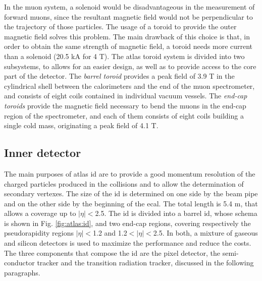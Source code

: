 In the muon system, a solenoid would be disadvantageous in the measurement of forward muons, since the resultant magnetic field would not be perpendicular to the trajectory of those particles. The usage of a toroid to provide the outer magnetic field solves this problem. The main drawback of this choice is that, in order to obtain the same strength of magnetic field, a toroid needs more current than a solenoid (20.5 kA for 4 T).
The \gls{atlas} toroid system is divided into two subsystems, to allows for an easier design, 
as well as to provide access to the core part of the detector.
The \textit{barrel toroid} \cite{ATLAS:1997ac} provides a peak field of 3.9 T in the cylindrical shell between the calorimeters and the end of the muon spectrometer, and consists of eight coils contained in individual vacuum vessels.  
The \textit{end-cap toroids} \cite{ATLAS:1997ab} provide the magnetic field necessary to bend the muons in the end-cap region of the spectrometer, and each of them consists of eight coils building a single cold mass, originating a peak field of 4.1 T. 



\subsection{Inner detector}
\label{sec:atlas:id}

The main purposes of \gls{atlas} \gls{id} \cite{ATLAS:1997ag,ATLAS:1997af} are to provide a good momentum resolution of the charged particles produced in the collisions and to allow the determination of secondary vertexes. The size of the \gls{id} is determined on one side by the beam pipe and on the other side by the beginning of the \gls{ecal}. The total length is 5.4 m, that allows a coverage up to $|\eta|<$2.5.
The \gls{id} is divided into a barrel \gls{id}, whose schema is shown in Fig. \ref{fig:atlas:id}, and two end-cap regions, covering respectively the pseudorapidity regions $|\eta|<$1.2 and 1.2$<|\eta|<$2.5. In both, a mixture of gaseous and silicon detectors is used to maximize the performance and reduce the costs. The three components that compose the \gls{id} are the pixel detector, the semi-conductor tracker and the transition radiation tracker, discussed in the following paragraphs.

